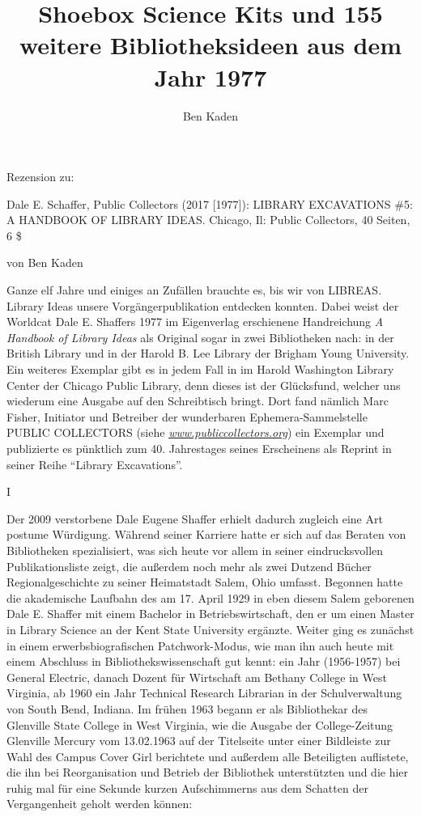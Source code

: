 \documentclass[a4paper,
fontsize=11pt,
oneside,
numbers=noperiodatend,
parskip=half-,
bibliography=totoc,
final
]{scrartcl}
\title{\LARGE{Shoebox Science Kits und 155 weitere Bibliotheksideen aus dem Jahr 1977}} %
\author{Ben Kaden} %
\date{}
\begin{document}
\maketitle
\thispagestyle{fancyplain} 


Rezension zu:

Dale E. Schaffer, Public Collectors (2017 {[}1977{]}): LIBRARY
EXCAVATIONS \#5: A HANDBOOK OF LIBRARY IDEAS. Chicago, Il: Public
Collectors, 40 Seiten, 6 \$

von Ben Kaden

Ganze elf Jahre und einiges an Zufällen brauchte es, bis wir von
LIBREAS. Library Ideas unsere Vorgängerpublikation entdecken konnten.
Dabei weist der Worldcat Dale E. Shaffers 1977 im Eigenverlag
erschienene Handreichung \emph{A Handbook of Library Ideas} als Original
sogar in zwei Bibliotheken nach: in der British Library und in der
Harold B. Lee Library der Brigham Young University. Ein weiteres
Exemplar gibt es in jedem Fall in im Harold Washington Library Center
der Chicago Public Library, denn dieses ist der Glücksfund, welcher uns
wiederum eine Ausgabe auf den Schreibtisch bringt. Dort fand nämlich
Marc Fisher, Initiator und Betreiber der wunderbaren
Ephemera-Sammelstelle PUBLIC COLLECTORS (siehe
\href{http://www.publiccollectors.org}{\emph{www.publiccollectors.org}})
ein Exemplar und publizierte es pünktlich zum 40. Jahrestages seines
Erscheinens als Reprint in seiner Reihe \enquote{Library Excavations}.

I

Der 2009 verstorbene Dale Eugene Shaffer erhielt dadurch zugleich eine
Art postume Würdigung. Während seiner Karriere hatte er sich auf das
Beraten von Bibliotheken spezialisiert, was sich heute vor allem in
seiner eindrucksvollen Publikationsliste zeigt, die außerdem noch mehr
als zwei Dutzend Bücher Regionalgeschichte zu seiner Heimatstadt Salem,
Ohio umfasst. Begonnen hatte die akademische Laufbahn des am 17. April
1929 in eben diesem Salem geborenen Dale E. Shaffer mit einem Bachelor
in Betriebswirtschaft, den er um einen Master in Library Science an der
Kent State University ergänzte. Weiter ging es zunächst in einem
erwerbsbiografischen Patchwork-Modus, wie man ihn auch heute mit einem
Abschluss in Bibliothekswissenschaft gut kennt: ein Jahr (1956-1957) bei
General Electric, danach Dozent für Wirtschaft am Bethany College in
West Virginia, ab 1960 ein Jahr Technical Research Librarian in der
Schulverwaltung von South Bend, Indiana. Im frühen 1963 begann er als
Bibliothekar des Glenville State College in West Virginia, wie die
Ausgabe der College-Zeitung Glenville Mercury vom 13.02.1963 auf der
Titelseite unter einer Bildleiste zur Wahl des Campus Cover Girl
berichtete und außerdem alle Beteiligten auflistete, die ihn bei
Reorganisation und Betrieb der Bibliothek unterstützten und die hier
ruhig mal für eine Sekunde kurzen Aufschimmerns aus dem Schatten der
Vergangenheit geholt werden können:
\end{document}
